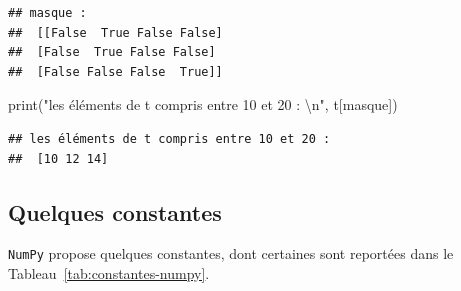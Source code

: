 \documentclass[12pt,]{book}
\newenvironment{Shaded}{\begin{snugshade}}{\end{snugshade}}
\newcommand{\CharTok}[1]{\textcolor[rgb]{0.31,0.60,0.02}{#1}}
\newcommand{\StringTok}[1]{\textcolor[rgb]{0.31,0.60,0.02}{#1}}
\newcommand{\BuiltInTok}[1]{#1}
\newcommand{\NormalTok}[1]{#1}
\numberwithin{equation}{section}
\numberwithin{countremarque}{section}
\begin{document}
\begin{lstlisting}
## masque : 
##  [[False  True False False]
##  [False  True False False]
##  [False False False  True]]
\end{lstlisting}

\begin{Shaded}
\begin{Highlighting}[]
\BuiltInTok{print}\NormalTok{(}\StringTok{"les éléments de t compris entre 10 et 20 : }\CharTok{\textbackslash{}n}\StringTok{"}\NormalTok{,}
\NormalTok{      t[masque])}
\end{Highlighting}
\end{Shaded}

\begin{lstlisting}
## les éléments de t compris entre 10 et 20 : 
##  [10 12 14]
\end{lstlisting}

\subsection{Quelques constantes}\label{numpy-constantes}

\texttt{NumPy} propose quelques constantes, dont certaines sont
reportées dans le Tableau~\ref{tab:constantes-numpy}.
\end{document}
